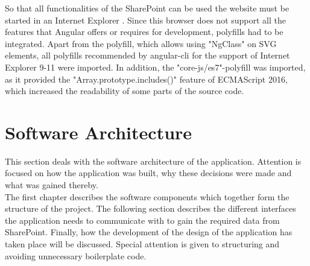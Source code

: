 \documentclass[Bachelor,BIF,english]{twbook}
\begin{document}
So that all functionalities of the SharePoint can be used the website must be started in an Internet Explorer \cite{IE}. Since this browser does not support all the features that Angular offers or requires for development, polyfills had to be integrated. Apart from the polyfill, which allows using "NgClass" on SVG elements, all polyfills recommended by angular-cli for the support of Internet Explorer 9-11 were imported. In addition, the "core-js/es7"-polyfill was imported, as it provided the "Array.prototype.includes()" feature of ECMAScript 2016, which increased the readability of some parts of the source code.


\section{Software Architecture}
This section deals with the software architecture of the application. Attention is focused on how the application was built, why these decisions were made and what was gained thereby.
\\[\baselineskip]
The first chapter describes the software components which together form the structure of the project. The following section describes the different interfaces the application needs to communicate with to gain the required data from SharePoint. Finally, how the development of the design of the application has taken place will be discussed. Special attention is given to structuring and avoiding unnecessary boilerplate code.
\end{document}
